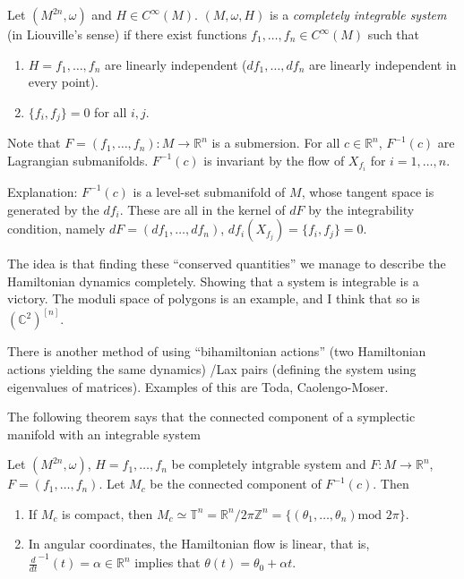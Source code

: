 \begin{definition}
\label{definition-completely-integrable-system}
Let $(M^{2n},\omega)$ and $H \in C^\infty(M)$.
$(M,\omega,H)$ is a {\it completely integrable system} 
(in Liouville's sense)
if there exist functions $f_1,\ldots,f_n \in C^\infty(M)$ such that
\begin{enumerate}
\item $H=f_1,\ldots,f_n$ are linearly independent
($df_1,\ldots,df_n$ are linearly independent in every point).

\item $\{ f_i, f_j\}=0$ for all $i,j$.
\end{enumerate}
\end{definition}

\noindent
Note that $F=(f_1,\ldots,f_n):M \to \mathbb{R}^n$ is a submersion.
For all $c \in \mathbb{R}^n$, $F^{-1}(c)$ 
are Lagrangian submanifolds.
$F^{-1}(c)$ is invariant by the flow of
$X_{f_i}$ for $i=1,\ldots,n$.

Explanation: $F^{-1}(c)$ is a level-set submanifold of $M$,
whose tangent space is generated by the $df_i$.
These are all in the kernel of $dF$ by the integrability condition,
namely $dF=(df_1,\ldots,df_n)$, $df_i(X_{f_j})=\{f_i,f_j\}=0$.

The idea is that finding these ``conserved quantities''
we manage to describe the Hamiltonian dynamics completely.
Showing that a system is integrable is a victory.
The moduli space of polygons is an example,
and I think that so is $(\mathbb{C}^2)^{[n]}$.

There is another method of using ``bihamiltonian actions''
(two Hamiltonian actions yielding the same dynamics)
/Lax pairs (defining the system using eigenvalues of matrices).
Examples of this are Toda, Caolengo-Moser.

\medskip\noindent
The following theorem says that the connected
component of a symplectic manifold with an integrable system


\begin{theorem}
\label{theorem-arnold-liouville}
Let $(M^{2n},\omega)$, $H=f_1,\ldots,f_n$ be completely intgrable system
and $F:M \to \mathbb{R}^n$, $F=(f_1,\ldots,f_n)$.
Let $M_c$ be the connected component of $F^{-1}(c)$.
Then
\begin{enumerate}
\item 
\label{item-toric1}
If $M_c$ is compact, then $M_c \simeq
\mathbb{T}^n=\mathbb{R}^n/2\pi\mathbb{Z}^n=\{(\theta_1,\ldots,\theta_n) \text{
mod }2\pi\}$.

\item 
\label{item-toric2}
In angular coordinates, the Hamiltonian flow is linear, that is,
$\frac{d}{dt}^{-1}(t)=\alpha \in \mathbb{R}^n$ 
implies that $\theta(t)=\theta_0+\alpha t$.
\end{enumerate}
\end{theorem}


